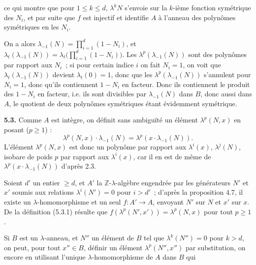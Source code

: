 ce qui
montre que pour \(1\le k\le d\), \(\lambda^k N\) s'envoie sur la \(k\)-ième fonction symétrique des \(N_i\), et par suite que \(f\) est injectif et identifie \(A\) à l'anneau des polynômes symétriques en les \(N_i\).

On a alors \(\lambda_{-1}(N)=\prod_{i=1}^{d}(1-N_i)\), et \(\lambda_t(\lambda_{-1}(N))=\lambda_t\bigl(\prod_{i=1}^{d}(1-N_i)\bigr)\). Les \(\lambda^p(\lambda_{-1}(N))\) sont des polynômes par rapport aux \(N_i\)~; si pour certain indice \(i\) on fait \(N_i=1\), on voit que \(\lambda_t(\lambda_{-1}(N))\) devient \(\lambda_t(0)=1\), donc que les \(\lambda^p(\lambda_{-1}(N))\) s'annulent pour \(N_i=1\), donc qu'ils contiennent \(1-N_i\) en facteur. Donc ils contiennent le produit des \(1-N_i\) en facteur, i.e. ils sont divisibles par \(\lambda_{-1}(N)\) dans \(B\), donc aussi dans \(A\), le quotient de deux polynômes symétriques étant évidemment symétrique.

\textbf{5.3.} Comme \(A\) est intègre, on définit sans ambiguïté un élément \(\lambda^p(N,x)\) en posant (\(p\ge1\)) :
\begin{equation}\tag{5.3.1}
  \lambda^p(N,x)\cdot\lambda_{-1}(N)=\lambda^p(x\cdot\lambda_{-1}(N)).
\end{equation}
L'élément \(\lambda^p(N,x)\) est donc un polynôme par rapport aux \(\lambda^i(x)\), \(\lambda^j(N)\), isobare de poids \(p\) par rapport aux \(\lambda^i(x)\), car il en est de même de \(\lambda^p(x\cdot\lambda_{-1}(N))\) d'après 2.3.

Soient \(d'\) un entier \(\ge d\), et \(A'\) la \(\mathbb Z\)-\(\lambda\)-algèbre engendrée par les générateurs \(N'\) et \(x'\) soumis aux relations \(\lambda^i(N')=0\) pour \(i>d'\)~; d'après la proposition 4.7, il existe un \(\lambda\)-homomorphisme et un seul \(f:A'\longrightarrow A\), envoyant \(N'\) sur \(N\) et \(x'\) sur \(x\). De la définition (5.3.1) résulte que \(f(\lambda^p(N',x'))=\lambda^p(N,x)\) pour tout \(p\ge1\).

Si \(B\) est un \(\lambda\)-anneau, et \(N''\) un élément de \(B\) tel que \(\lambda^k(N'')=0\) pour \(k>d\), on peut, pour tout \(x''\in B\), définir un élément \(\lambda^p(N'',x'')\) par substitution, on encore en utilisant l'unique \(\lambda\)-homomorphisme de \(A\) dans \(B\) qui
